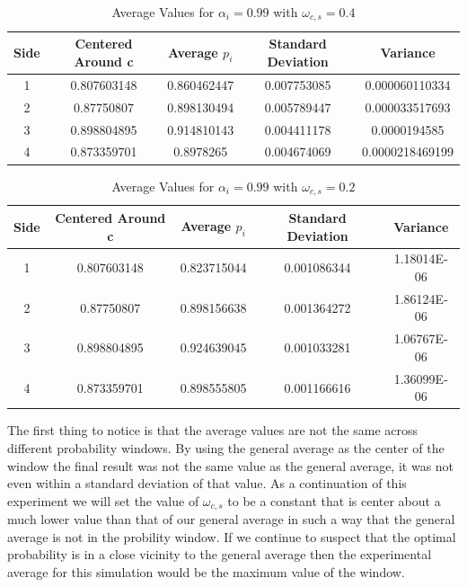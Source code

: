 \documentclass{article}
\begin{document}
\begin{table}[h!]
\centering
\caption{Average Values for $\alpha_i = 0.99$ with $\omega_{c,s} = 0.4$}
\label{tab:table1}
\begin{tabular}{|c|c|c|c|c|}
\hline
Side  & Centered Around c & Average $p_i$ & Standard Deviation & Variance\\
\hline
1 & 0.807603148 & 0.860462447 & 0.007753085 & 0.000060110334\\
2 & 0.87750807 & 0.898130494 & 0.005789447 & 0.000033517693\\
3 & 0.898804895 & 0.914810143 & 0.004411178 & 0.0000194585\\
4 & 0.873359701 & 0.8978265 & 0.004674069 & 0.0000218469199\\
\hline
\end{tabular}
\end{table}

\begin{table}[h!]
\centering
\caption{Average Values for $\alpha_i = 0.99$ with $\omega_{c,s} = 0.2$}
\label{tab:table1}
\begin{tabular}{|c|c|c|c|c|}
\hline
Side  & Centered Around c & Average $p_i$ & Standard Deviation & Variance\\
\hline
1 & 0.807603148 & 0.823715044 & 0.001086344 & 1.18014E-06\\
2 & 0.87750807 & 0.898156638 & 0.001364272 & 1.86124E-06\\
3 & 0.898804895 & 0.924639045 & 0.001033281 & 1.06767E-06\\
4 & 0.873359701 & 0.898555805 & 0.001166616 & 1.36099E-06\\
\hline
\end{tabular}
\end{table}

The first thing to notice is that the average values are not the same across different probability windows.  By using the general average as the center of the window the final result was not the same value as the general average, it was not even within a standard deviation of that value.  As a continuation of this experiment we will set the value of $\omega_{c,s}$ to be a constant that is center about a much lower value than that of our general average in such a way that the general average is not in the probility window.  If we continue to suspect that the optimal probability is in a close vicinity to the general average then the experimental average for this simulation would be the maximum value of the window.
\end{document}
